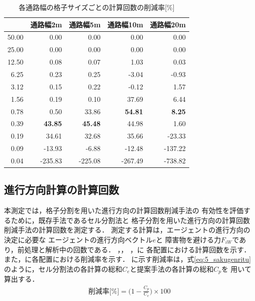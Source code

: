 \begin{table}[tb]
  \centering
  \caption{各通路幅の格子サイズごとの計算回数の削減率[\%]}
  \label{tb:5_times_sakugenritu}
    \begin{tabular}{r|r|r|r|r}
    \hline \hline
              & 通路幅2m       & 通路幅5m       & 通路幅10m      & 通路幅20m     \\ \hline
        50.00 & 0.00           & 0.00           & 0.00           & 0.00          \\ \hline
        25.00 & 0.00           & 0.00           & 0.00           & 0.00          \\ \hline
        12.50 & 0.08           & 0.07           & 1.03           & 0.03          \\ \hline
        6.25  & 0.23           & 0.25           & -3.04          & -0.93         \\ \hline
        3.12  & 0.15           & 0.22           & -0.12          & 1.57          \\ \hline
        1.56  & 0.19           & 0.10           & 37.69          & 6.44          \\ \hline
        0.78  & 0.50           & 33.86          & \textbf{54.81} & \textbf{8.25} \\ \hline
        0.39  & \textbf{43.85} & \textbf{45.48} & 44.98          & 1.60          \\ \hline
        0.19  & 34.61          & 32.68          & 35.66          & -23.33        \\ \hline
        0.09  & -13.93         & -6.88          & -12.48         & -137.22       \\ \hline
        0.04  & -235.83        & -225.08        & -267.49        & -738.82       \\ \hline
    \end{tabular}
\end{table}

\subsection{進行方向計算の計算回数}
\label{sec:5_calc_times}
本測定では，格子分割を用いた進行方向の計算回数削減手法の
有効性を評価するために，既存手法であるセル分割法と
格子分割を用いた進行方向の計算回数削減手法の計算回数を測定する．
測定する計算は，エージェントの進行方向の決定に必要な
エージェントの進行方向ベクトル$e$と
障害物を避ける力$F_{iW}$であり，前処理と解析中の回数である．
，，
，に
各配置における計算回数を示す．
また，に各配置における削減率を示す．
に示す削減率は，式\eqref{eq:5_sakugenritu}
のように，セル分割法の各計算の総和$C_e$と提案手法の各計算の総和$C_p$を
用いて算出する．
%
\begin{eqnarray}
\mbox{削減率[\%]} = \Big ( 1 - \frac{C_p}{C_e}  \Big) \times 100
\label{eq:5_sakugenritu}
\end{eqnarray}
%

